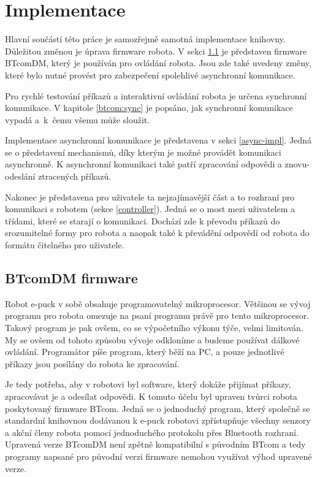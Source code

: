 \chapter{Implementace}
\label{Implementace}

    Hlavní součástí této práce je samozřejmě samotná implementace knihovny.
    Důležitou změnou je úprava firmware robota. V sekci \ref{btcom} je
    představen firmware BTcomDM, který je používán pro ovládání robota. Jsou
    zde také uvedeny změny, které bylo nutné provést pro zabezpečení spolehlivé
    asynchronní komunikace.

    Pro rychlé testování příkazů a interaktivní ovládání robota je určena
    synchronní komunikace. V kapitole \ref{btcom:sync} je popsáno, jak
    synchronní komunikace vypadá a~k~čemu všemu může sloužit.

    Implementace asynchronní komunikace je představena v sekci
    \ref{async-impl}. Jedná se o představení mechanismů, díky kterým je možné
    provádět komunikaci asynchronně. K asynchronní komunikaci také patří
    zpracování odpovědi a znovu-odeslání ztracených příkazů.

    Nakonec je představena pro uživatele ta nejzajímavější část a to rozhraní
    pro komunikaci s robotem (sekce \ref{controller}). Jedná se o most mezi
    uživatelem a třídami, které se starají o komunikaci. Dochází zde k převodu
    příkazů do srozumitelné formy pro robota a naopak také k převádění odpovědí
    od robota do formátu čitelného pro uživatele.

    \section{BTcomDM firmware}
    \label{btcom}

    Robot e-puck v sobě obsahuje programovatelný mikroprocesor. Většinou se
    vývoj programu pro robota omezuje na psaní programu právě pro tento
    mikroprocesor. Takový program je pak ovšem, co se výpočetního výkonu týče,
    velmi limitován. My se ovšem od tohoto způsobu vývoje odkloníme a budeme
    používat dálkové ovládání. Programátor píše program, který běží na PC, a
    pouze jednotlivé příkazy jsou posílány do robota ke zpracování.

    Je tedy potřeba, aby v robotovi byl software, který dokáže přijímat
    příkazy, zpracovávat je a odesílat odpovědi. K tomuto účelu byl upraven
    tvůrci robota poskytovaný firmware BTcom. Jedná se o jednoduchý program,
    který společně se standardní knihovnou dodávanou k e-puck robotovi
    zpřístupňuje všechny senzory a akční členy robota pomocí jednoduchého
    protokolu přes Bluetooth rozhraní. Upravená verze BTcomDM není zpětně
    kompatibilní s původním BTcom a tedy programy napsané pro původní verzi
    firmware nemohou využívat výhod upravené verze.

